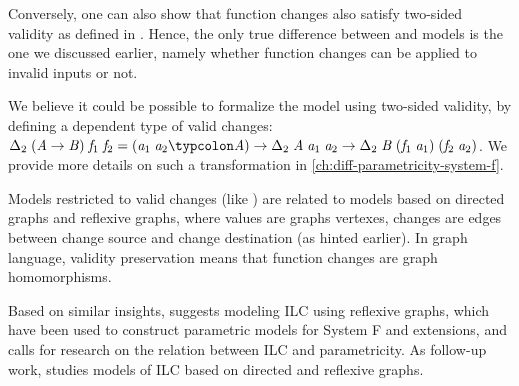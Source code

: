 
Conversely, one can also show that \ilcA{} function changes also satisfy
two-sided validity as defined in \ilcB{}. Hence, the only true difference
between \ilcA{} and \ilcB{} models is the one we discussed earlier, namely
whether function changes can be applied to invalid inputs or not.

We believe it could be possible to formalize the \ilcA{} model using two-sided
validity, by defining a dependent type of valid changes:
\ensuremath{\Delta_2\;(\Conid{A}\to \Conid{B})\;\Varid{f}_{1}\;\Varid{f}_{2}\mathrel{=}(\Varid{a}_{1}\;\Varid{a}_{2}\typcolon\Conid{A})\to \Delta_2\;\Conid{A}\;\Varid{a}_{1}\;\Varid{a}_{2}\to \Delta_2\;\Conid{B}\;(\Varid{f}_{1}\;\Varid{a}_{1})\;(\Varid{f}_{2}\;\Varid{a}_{2})}.
We provide more details on such a transformation in
\cref{ch:diff-parametricity-system-f}.

Models restricted to valid changes (like \ilcA{}) are related to models based on
directed graphs and reflexive graphs, where values are graphs vertexes, changes
are edges between change source and change destination (as hinted earlier). In
graph language, validity preservation means that function changes are graph
homomorphisms.

Based on similar insights, \citet{Atkey2015ILC} suggests modeling ILC using
reflexive graphs, which have been used to construct parametric models for System
F and extensions, and calls for research on the relation between ILC and
parametricity. As follow-up work, \citet{CaiPhD} studies models of ILC based on
directed and reflexive graphs.



